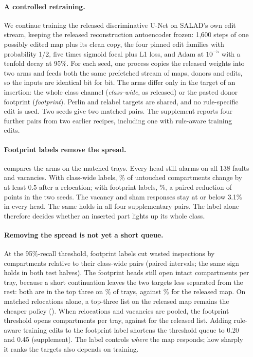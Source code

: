 \paragraph{A controlled retraining.}
We continue training the released discriminative U-Net on SALAD's own edit stream, keeping the released reconstruction autoencoder frozen: 1{,}600 steps of one possibly edited map plus its clean copy, the four pinned edit families with probability 1/2, five times sigmoid focal plus L1 loss, and Adam at $10^{-5}$ with a tenfold decay at 95\%. For each seed, one process copies the released weights into two arms and feeds both the same prefetched stream of maps, donors and edits, so the inputs are identical bit for bit. The arms differ only in the target of an insertion: the whole class channel (\emph{class-wide}, as released) or the pasted donor footprint (\emph{footprint}). Perlin and relabel targets are shared, and no rule-specific edit is used. Two seeds give two matched pairs. The supplement reports four further pairs from two earlier recipes, including one with rule-aware training edits.

\paragraph{Footprint labels remove the spread.}
 compares the arms on the matched trays. Every head still alarms on all 138 faults and vacancies. With class-wide labels, \cwSpread\% of untouched compartments change by at least 0.5 after a relocation; with footprint labels, \fpSpread\%, a paired reduction of \dSpread{} points in the two seeds. The vacancy and sham responses stay at or below 3.1\% in every head. The same holds in all four supplementary pairs. The label alone therefore decides whether an inserted part lights up its whole class.

\paragraph{Removing the spread is not yet a short queue.}
At the 95\%-recall threshold, footprint labels cut wasted inspections by \dThrW{} compartments relative to their class-wide pairs (paired intervals; the same sign holds in both test halves). The footprint heads still open \fpThrW{} intact compartments per tray, because a short continuation leaves the two targets less separated from the rest: both are in the top three on \fpTopThree\% of trays, against \relTopThree\% for the released map. On matched relocations alone, a top-three list on the released map remains the cheaper policy (\relListW). When relocations and vacancies are pooled, the footprint threshold opens \fpPoolW{} compartments per tray, against \relPoolListW{} for the released list. Adding rule-aware training edits to the footprint label shortens the threshold queue to 0.20 and 0.45 (supplement). The label controls \emph{where} the map responds; how sharply it ranks the targets also depends on training.

